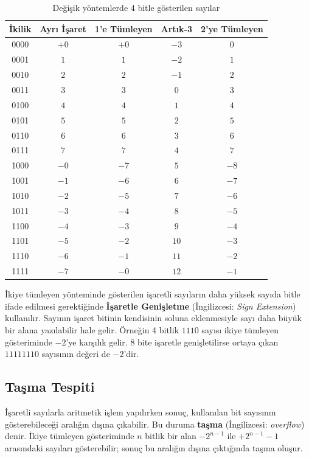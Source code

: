 \begin{table}[H]
\centering
\caption{Değişik yöntemlerde 4 bitle gösterilen sayılar}
\label{tab:isaretli-yontemler}
\begin{tabular}{ccccc}
\toprule
\textbf{İkilik} & \textbf{Ayrı İşaret} & \textbf{1'e Tümleyen} & \textbf{Artık-3} & \textbf{2'ye Tümleyen} \\
\midrule
0000 & $+0$ & $+0$ & $-3$ & $0$  \\
0001 & $1$  & $1$  & $-2$ & $1$  \\
0010 & $2$  & $2$  & $-1$ & $2$  \\
0011 & $3$  & $3$  & $0$  & $3$  \\
0100 & $4$  & $4$  & $1$  & $4$  \\
0101 & $5$  & $5$  & $2$  & $5$  \\
0110 & $6$  & $6$  & $3$  & $6$  \\
0111 & $7$  & $7$  & $4$  & $7$  \\
1000 & $-0$ & $-7$ & $5$  & $-8$ \\
1001 & $-1$ & $-6$ & $6$  & $-7$ \\
1010 & $-2$ & $-5$ & $7$  & $-6$ \\
1011 & $-3$ & $-4$ & $8$  & $-5$ \\
1100 & $-4$ & $-3$ & $9$  & $-4$ \\
1101 & $-5$ & $-2$ & $10$ & $-3$ \\
1110 & $-6$ & $-1$ & $11$ & $-2$ \\
1111 & $-7$ & $-0$ & $12$ & $-1$ \\
\bottomrule
\end{tabular}
\end{table}

İkiye tümleyen yönteminde gösterilen işaretli sayıların daha yüksek sayıda bitle ifade edilmesi gerektiğinde \textbf{İşaretle Genişletme} (İngilizcesi: \textit{Sign Extension}) kullanılır. Sayının işaret bitinin kendisinin soluna eklenmesiyle sayı daha büyük bir alana yazılabilir hale gelir. Örneğin 4 bitlik $1110$ sayısı ikiye tümleyen gösteriminde $-2$'ye karşılık gelir. 8 bite işaretle genişletilirse ortaya çıkan $11111110$ sayısının değeri de $-2$'dir.

\subsection{Taşma Tespiti}
\label{sec:tasma-tespiti}

İşaretli sayılarla aritmetik işlem yapılırken sonuç, kullanılan bit sayısının gösterebileceği aralığın dışına çıkabilir. Bu duruma \textbf{taşma} (İngilizcesi: \textit{overflow}) denir. İkiye tümleyen gösteriminde $n$ bitlik bir alan $-2^{n-1}$ ile $+2^{n-1}-1$ arasındaki sayıları gösterebilir; sonuç bu aralığın dışına çıktığında taşma oluşur.

